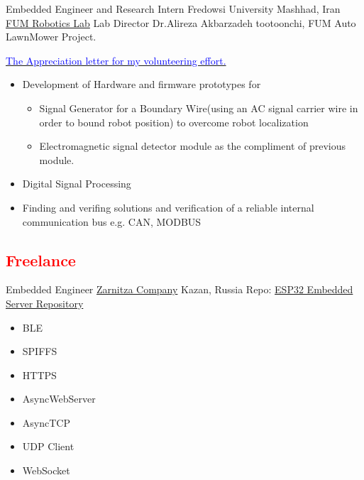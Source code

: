     {Embedded Engineer and Research Intern}
    {Fredowsi University}
    {Mashhad, Iran}
    {
    \newline
    \href{https://www.fumrobotics.ir/people/}{\color{blue}FUM Robotics Lab}
    Lab Director Dr.Alireza Akbarzadeh tootoonchi, FUM Auto LawnMower Project. 
    }
    {
    \href{https://drive.google.com/file/d/18mR13rZAn1kt_DuWFklTObaAwn6ODe9N/view?usp=sharing}{\textcolor{blue}{The Appreciation letter for my volunteering effort.}}
    \begin{itemize}
    \item Development of Hardware and firmware prototypes for 
        \begin{itemize}
            \item  Signal Generator for a Boundary Wire(using an AC signal carrier wire in order to bound robot position) to overcome robot localization 
            \item  Electromagnetic signal detector module as the compliment of previous module.
        \end{itemize}
    \item Digital Signal Processing
    \item Finding and verifing solutions and verification of a reliable internal communication bus e.g. CAN, MODBUS
    \end{itemize}
    }





\vspace{2mm}

\subsection{\Large{\textcolor{red}{Freelance}}}

        {Embedded Engineer}
        {\href{https://zarnitza.ru/}{\color{blue}Zarnitza Company}}
        {Kazan, Russia}
        {
        \newline
        Repo: \href{https://github.com/Ehsan2754/embedded-server}{\color{blue}ESP32 Embedded Server Repository}
        } 
        {
        \begin{itemize}
            \item  BLE
            \item SPIFFS
            \item HTTPS 
            \item AsyncWebServer
            \item AsyncTCP 
            \item UDP Client
            \item WebSocket
        \end{itemize}
        }
        
